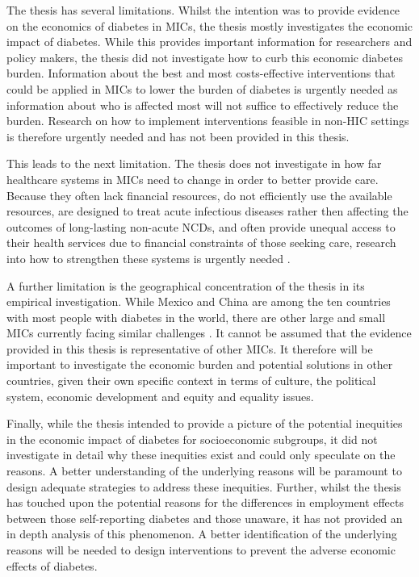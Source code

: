 The thesis has several limitations. Whilst the intention was to provide evidence on the economics of diabetes in \acp{MIC}, the thesis mostly investigates the economic impact of diabetes. While this provides important information for researchers and policy makers, the thesis did not investigate how to curb this economic diabetes burden. Information about the best and most costs-effective interventions that could be applied in \acp{MIC} to lower the burden of diabetes is urgently needed as information about who is affected most will not suffice to effectively reduce the burden. Research on how to implement interventions feasible in non-\ac{HIC} settings is therefore urgently needed and has not been provided in this thesis.

This leads to the next limitation. The thesis does not investigate in how far healthcare systems in \acp{MIC} need to change in order to better provide care. Because they often lack financial resources, do not efficiently use the available resources, are designed to treat acute infectious diseases rather then affecting the outcomes of long-lasting non-acute \acp{NCD}, and often provide unequal access to their health services due to financial constraints of those seeking care, research into how to strengthen these systems is urgently needed \parencite{Mills2014,Guzman2010}.

A further limitation is the geographical concentration of the thesis in its empirical investigation. While Mexico and China are among the ten countries with most people with diabetes in the world, there are other large and small \acp{MIC} currently facing similar challenges \parencite{Risk2016}.  It cannot be assumed that the evidence provided in this thesis is representative of other \acp{MIC}. It therefore will be important to investigate the economic burden and potential solutions in other countries, given their own specific context in terms of culture, the political system, economic development and equity and equality issues.

Finally, while the thesis intended to provide a picture of the potential inequities in the economic impact of diabetes for socioeconomic subgroups, it did not investigate in detail why these inequities exist and could only speculate on the reasons. A better understanding of the underlying reasons will be paramount to design adequate strategies to address these inequities. Further, whilst the thesis has touched upon the potential reasons for the differences in employment effects between those self-reporting diabetes and those unaware, it has not provided an in depth analysis of this phenomenon. A better identification of the underlying reasons will be needed to design interventions to prevent the adverse economic effects of diabetes. 



